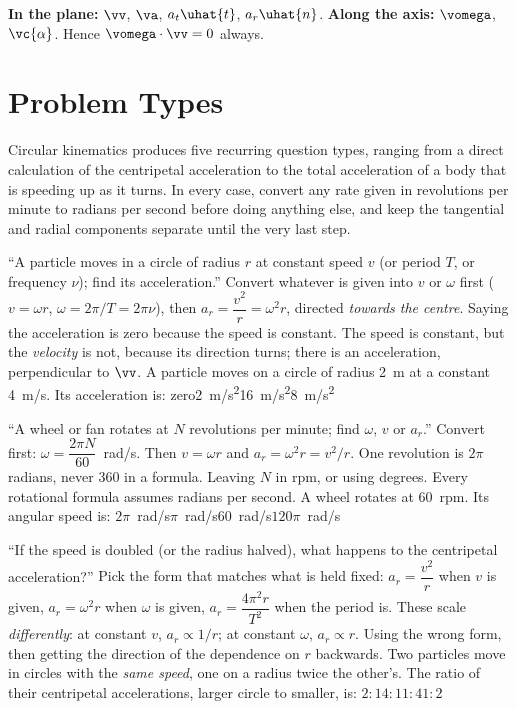 \medskip
\textbf{In the plane:} $\vv$, $\va$, $a_t\uhat{t}$, $a_r\uhat{n}$. \quad
\textbf{Along the axis:} $\vomega$, $\vc{\alpha}$. \quad
Hence $\vomega\cdot\vv=0$ always.

\section{Problem Types}\label{sec:types6}
Circular kinematics produces five recurring question types, ranging from a direct calculation of the
centripetal acceleration to the total acceleration of a body that is speeding up as it turns. In every
case, convert any rate given in revolutions per minute to radians per second before doing anything else,
and keep the tangential and radial components separate until the very last step.

{``A particle moves in a circle of radius $r$ at constant speed $v$ (or period $T$, or frequency
$\nu$); find its acceleration.''}
{Convert whatever is given into $v$ or $\omega$ first ($v=\omega r$, $\omega=2\pi/T=2\pi\nu$), then
$a_r=\dfrac{v^2}{r}=\omega^2 r$, directed \emph{towards the centre}.}
{Saying the acceleration is zero because the speed is constant. The speed is constant, but the
\emph{velocity} is not, because its direction turns; there is an acceleration, perpendicular to $\vv$.}
{A particle moves on a circle of radius \SI{2}{m} at a constant \SI{4}{m/s}. Its acceleration is:}
{zero}{\SI{2}{m/s^2}}{\SI{16}{m/s^2}}{\SI{8}{m/s^2}}

{``A wheel or fan rotates at $N$ revolutions per minute; find $\omega$, $v$ or $a_r$.''}
{Convert first: $\omega=\dfrac{2\pi N}{60}$~\si{rad/s}. Then $v=\omega r$ and $a_r=\omega^2r=v^2/r$. One
revolution is $2\pi$ radians, never $360$ in a formula.}
{Leaving $N$ in rpm, or using degrees. Every rotational formula assumes radians per second.}
{A wheel rotates at \SI{60}{rpm}. Its angular speed is:}
{$2\pi$~\si{rad/s}}{$\pi$~\si{rad/s}}{\SI{60}{rad/s}}{$120\pi$~\si{rad/s}}

{``If the speed is doubled (or the radius halved), what happens to the centripetal acceleration?''}
{Pick the form that matches what is held fixed: $a_r=\dfrac{v^2}{r}$ when $v$ is given,
$a_r=\omega^2r$ when $\omega$ is given, $a_r=\dfrac{4\pi^2r}{T^2}$ when the period is. These scale
\emph{differently}: at constant $v$, $a_r\propto1/r$; at constant $\omega$, $a_r\propto r$.}
{Using the wrong form, then getting the direction of the dependence on $r$ backwards.}
{Two particles move in circles with the \emph{same speed}, one on a radius twice the other's. The ratio
of their centripetal accelerations, larger circle to smaller, is:}
{$2:1$}{$4:1$}{$1:4$}{$1:2$}

